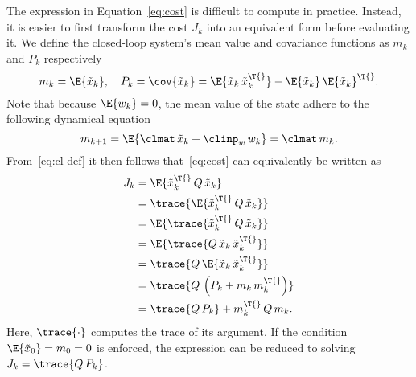The expression in Equation~\eqref{eq:cost} is difficult to compute in practice.
Instead, it is easier to first transform the cost $J_k$ into an equivalent form before evaluating it.
We define the closed-loop system's mean value and covariance functions as $m_k$ and $P_k$ respectively
%
\begin{equation}%
    \label{eq:cl-def}%
    m_k = \E{\tilde{x}_k}, \quad P_k = \cov{\tilde{x}_k} = \E{\tilde{x}_k\, \tilde{x}_k^\T{}} - \E{\tilde{x}_k}\,\E{\tilde{x}_k}^\T{}.
\end{equation}
%
Note that because $\E{w_k} = 0$, the mean value of the state adhere to the following dynamical equation
%
\begin{equation*}%
    m_{k+1} = \E{\clmat\,\tilde{x}_k + \clinp_w\,w_k} = \clmat\, m_k.
\end{equation*}
%
From~\eqref{eq:cl-def} it then follows that~\eqref{eq:cost} can equivalently be written as~\cite{Bates:2011}
%
\begin{equation}%
    \label{eq:tr-cost}%
    \begin{aligned}
        J_k &= \E{\tilde{x}_k^\T{}\, Q\, \tilde{x}_k} \\
        &= \trace{\E{\tilde{x}_k^\T{}\, Q\, \tilde{x}_k}} \\
        &= \E{\trace{\tilde{x}_k^\T{}\, Q\, \tilde{x}_k}} \\
        &= \E{\trace{Q\, \tilde{x}_k\, \tilde{x}_k^\T{}}} \\
        &= \trace{Q\, \E{\tilde{x}_k\,\tilde{x}_k^\T{}}} \\
        &= \trace{Q\, \left( P_k + m_k\,m_k^\T{} \right)} \\
        &= \trace{Q\, P_k} + m_k^\T{}\, Q\, m_k.
    \end{aligned}
\end{equation}
%
Here, $\trace{\cdot}$ computes the trace of its argument.
If the condition $\E{\tilde{x}_0} = m_0 = 0$ is enforced, the expression can be reduced to solving $J_k = \trace{Q\, P_k}$.

